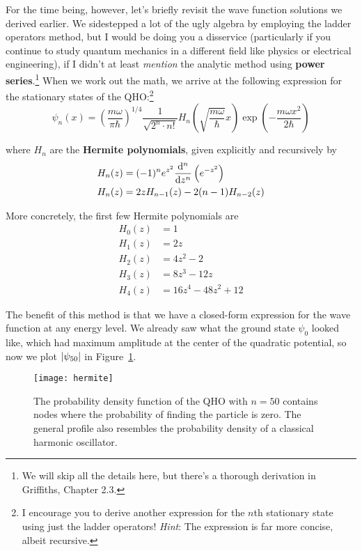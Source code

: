 For the time being, however, let's briefly revisit the wave function solutions we derived earlier. We sidestepped a lot of the ugly algebra by employing the ladder operators method, but I would be doing you a disservice (particularly if you continue to study quantum mechanics in a different field like physics or electrical engineering), if I didn't at least \emph{mention} the analytic method using \textbf{power series}.\footnote{We will skip all the details here, but there's a thorough derivation in Griffiths, Chapter 2.3.} When we work out the math, we arrive at the following expression for the stationary states of the QHO:\footnote{I encourage you to derive another expression for the $n$th stationary state using just the ladder operators! \emph{Hint}: The expression is far more concise, albeit recursive.} 
\begin{equation}
	\psi_n(x) = \left(\frac{m\omega}{\pi\hbar}\right)^{1/4} \frac{1}{\sqrt{2^n \cdot n!}} H_n \left(\sqrt{\frac{m\omega}{\hbar}}x\right) \exp \left(-\frac{m\omega x^2}{2\hbar}\right) \label{eq:pow-qho}
\end{equation}

where $H_n$ are the \textbf{Hermite polynomials}, given explicitly and recursively by
\begin{align*}
	H_n(z) &= (-1)^n e^{z^2} \dv[n]{z} \left( e^{-z^2} \right) \\
	H_n(z) &= 2zH_{n-1}(z) - 2(n-1)H_{n-2}(z)
\end{align*}

More concretely, the first few Hermite polynomials are
\begin{align*}
	H_0(z) &= 1 \\
	H_1(z) &= 2z \\
	H_2(z) &= 4z^2-2 \\
	H_3(z) &= 8z^3 - 12z \\
	H_4(z) &= 16z^4 - 48z^2 + 12
\end{align*}

The benefit of this method is that we have a closed-form expression for the wave function at any energy level. We already saw what the ground state $\psi_0$ looked like, which had maximum amplitude at the center of the quadratic potential, so now we plot $\abs{\psi_{50}}$ in Figure~\ref{fig:qho-50}.

\begin{figure}[!h]
	\centering
	\texttt{[image: hermite]}
	\caption{The probability density function of the QHO with $n=50$ contains nodes where the probability of finding the particle is zero. The general profile also resembles the probability density of a classical harmonic oscillator.}
	\label{fig:qho-50}
\end{figure}

